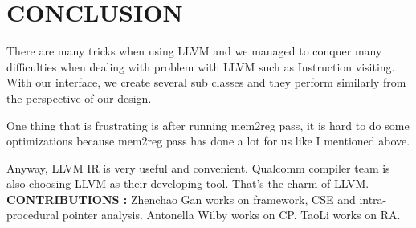 \section{CONCLUSION}

There are many tricks when using LLVM and we managed to conquer many difficulties when dealing with problem with LLVM such as Instruction visiting. With our interface, we create several sub classes and they perform similarly from the perspective of our design.

One thing that is frustrating is after running mem2reg pass, it is hard to do some optimizations because mem2reg pass has done a lot for us like I mentioned above.

Anyway, LLVM IR is very useful and convenient. Qualcomm compiler team is also choosing LLVM as their developing tool. That's the charm of LLVM. \\

\textbf{ CONTRIBUTIONS : } Zhenchao Gan works on framework, CSE and intra-procedural pointer analysis. Antonella Wilby works on CP. TaoLi works on RA.